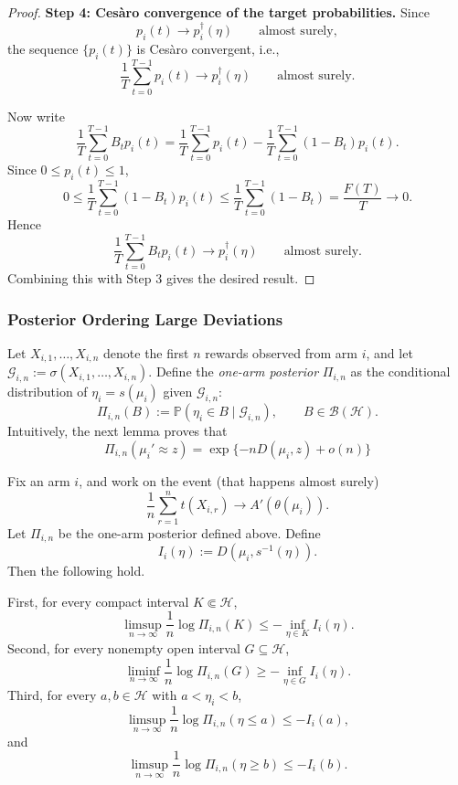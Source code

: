 \documentclass[10pt]{article}
\theoremstyle{plain}
\begin{document}
\begin{proof}
\textbf{Step 4: Ces\`aro convergence of the target probabilities.}
Since
\[
p_i(t)\to p_i^\dagger(\eta)
\qquad\text{almost surely},
\]
the sequence $\{p_i(t)\}$ is Ces\`aro convergent, i.e., 
\[
\frac1T\sum_{t=0}^{T-1}p_i(t)
\to
p_i^\dagger(\eta)
\qquad\text{almost surely}.
\]

Now write
\[
\frac1T\sum_{t=0}^{T-1}B_t p_i(t)
=
\frac1T\sum_{t=0}^{T-1}p_i(t)
-
\frac1T\sum_{t=0}^{T-1}(1-B_t)p_i(t).
\]
Since $0\le p_i(t)\le1$,
\[
0\le
\frac1T\sum_{t=0}^{T-1}(1-B_t)p_i(t)
\le
\frac1T\sum_{t=0}^{T-1}(1-B_t)
=
\frac{F(T)}{T}
\to0.
\]
Hence
\[
\frac1T\sum_{t=0}^{T-1}B_t p_i(t)
\to
p_i^\dagger(\eta)
\qquad\text{almost surely}.
\]
Combining this with Step 3 gives the desired result.

\end{proof}

\subsubsection{Posterior Ordering Large Deviations}


Let \(X_{i,1},\ldots,X_{i,n}\) denote the first \(n\) rewards observed from
arm \(i\), and let
    $\mathcal G_{i,n}:=\sigma(X_{i,1},\ldots,X_{i,n})$.
Define the \emph{one-arm posterior} \(\varPi_{i,n}\) as the conditional distribution
of \(\eta_i=s(\mu_i)\) given \(\mathcal G_{i,n}\):
\[
    \varPi_{i,n}(B)
    :=
    \mathbb P(\eta_i\in B\mid\mathcal G_{i,n}),
    \qquad B\in\mathcal B(\mathcal H).
\]
Intuitively, the next lemma proves that $$
\varPi_{i,n} (\mu_i'\approx z) = \exp\{ -nD(\mu_i,z) + o(n) \}
$$

\begin{lemma}
\label{lem:one-arm-laplace-simple-upper}
Fix an arm \(i\), and work on the event (that happens almost surely)
\[
    \frac1n\sum_{r=1}^nt(X_{i,r})
    \to
    A'(\theta(\mu_i)).
\]
Let \(\varPi_{i,n}\) be the one-arm posterior defined above.  Define
\[
    I_i(\eta):=D(\mu_i,s^{-1}(\eta)).
\]
Then the following hold.

First, for every compact interval \(K\Subset\mathcal H\),
\[
    \limsup_{n\to\infty}
    \frac1n\log\varPi_{i,n}(K)
    \le
    -\inf_{\eta\in K} I_i(\eta).
\]
Second, for every nonempty open interval \(G\subseteq\mathcal H\),
\[
    \liminf_{n\to\infty}
    \frac1n\log\varPi_{i,n}(G)
    \ge
    -\inf_{\eta\in G} I_i(\eta).
\]
Third, for every \(a,b\in\mathcal H\) with \(a<\eta_i<b\),
\[
    \limsup_{n\to\infty}
    \frac1n\log\varPi_{i,n}(\eta\le a)
    \le
    -I_i(a),
\]
and
\[
    \limsup_{n\to\infty}
    \frac1n\log\varPi_{i,n}(\eta\ge b)
    \le
    -I_i(b).
\]
\end{lemma}
\end{document}
